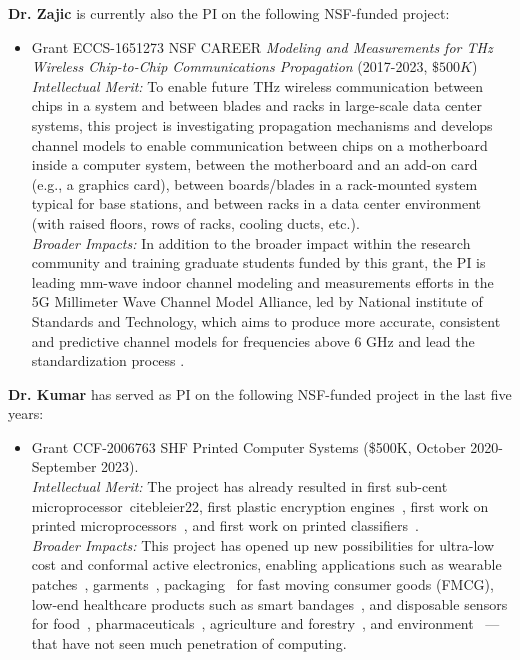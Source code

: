 \documentclass[11 pt]{article}
\begin{document}
{\bf Dr. Zajic} is currently also the PI on the following NSF-funded project:
\begin{itemize}[topsep=0pt,itemsep=0pt]
\item Grant ECCS-1651273 NSF CAREER \textit{Modeling and Measurements for THz Wireless Chip-to-Chip Communications Propagation} (2017-2023, $\$500K$) \\
\textit{Intellectual Merit:}
To enable future THz wireless communication between chips in a system and between blades and racks in large-scale data center systems, this project is investigating  propagation mechanisms \cite{Cheng2020,Kim2016,Fu2019} and develops channel models \cite{Kim2016a,Fu2020} to enable communication between chips on a motherboard inside a computer system, between the motherboard and an add-on card (e.g., a graphics card), between boards/blades in a rack-mounted system typical for base stations, and between racks in a data center environment (with raised floors, rows of racks, cooling ducts, etc.). \\
\textit{Broader Impacts:}
In addition to the broader impact within the research community and training graduate students funded by this grant, the PI is leading mm-wave indoor channel modeling and measurements efforts in the 5G Millimeter Wave Channel Model Alliance, led by National institute of Standards and Technology, which aims to produce more accurate, consistent and predictive channel models for frequencies above 6 GHz and lead the standardization process \cite{Book}.
\end{itemize}

{\bf Dr. Kumar} has served as PI on the following NSF-funded project in
the last five years:
\begin{itemize}[topsep=0pt,itemsep=0pt]
\item Grant CCF-2006763 SHF Printed Computer Systems (\$500K, October 2020- September 2023).\\
\textit{Intellectual Merit:} The project has already resulted in first sub-cent microprocessor~cite{bleier22}, first plastic encryption engines~\cite{bleier23},
first work on printed microprocessors~\cite{bleier2020printed}, and first work on printed classifiers~\cite{mubarik20}.\\
\textit{Broader Impacts:} This project has opened up new possibilities for ultra-low cost and conformal active electronics, enabling applications such as wearable patches~\cite{8502791},
garments~\cite{garments}, packaging~\cite{gethin2013printed} for fast moving consumer goods (FMCG), low-end healthcare products such as smart
bandages~\cite{DERAKHSHANDEH20181259}, and disposable sensors for food~\cite{7994325}, pharmaceuticals~\cite{BERGAMINI200554},
agriculture and forestry~\cite{chemosensors8040125}, and environment~\cite{MARRAZZA1999297} --- that have not seen much penetration of computing.
\end{itemize}



\end{document}
